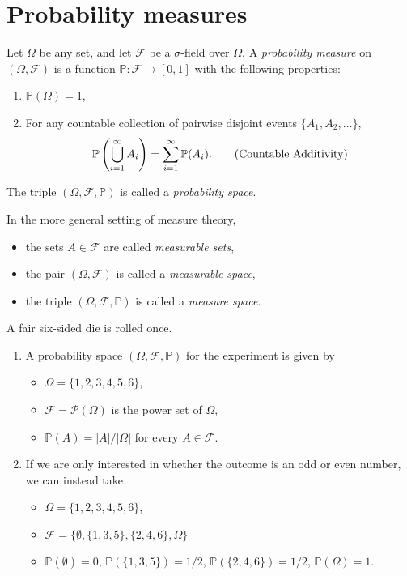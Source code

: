 \documentclass[lecture]{csm}
\newcommand{\prob}{\mathbb{P}}
\def\it{\item}
\def\bit{\begin{itemize}}
\def\eit{\end{itemize}}
\def\ben{\begin{enumerate}}
\def\een{\end{enumerate}}
\begin{document}
\maketitle
\tableofcontents

\section{Probability measures}

\begin{definition}
Let $\Omega$ be any set, and let $\mathcal{F}$ be a $\sigma$-field over $\Omega$. 
A \emph{probability measure} on $(\Omega,\mathcal{F})$ is a function $\prob:\mathcal{F}\to[0,1]$ with the following properties:
\ben
\it $\prob(\Omega) = 1$,
\it For any countable collection of pairwise disjoint events $\{A_1,A_2,\ldots\}$,
\[
\prob\left(\bigcup_{i=1}^\infty A_i\right) = \sum_{i=1}^{\infty} \prob(A_i).
\text{\qquad (Countable Additivity)}
\]
\een
The triple $(\Omega,\mathcal{F},\prob)$ is called a \emph{probability space}.
\end{definition}


\begin{remark}
In the more general setting of measure theory,
\bit
\it the sets $A\in\mathcal{F}$ are called \emph{measurable sets},
\it the pair $(\Omega,\mathcal{F})$ is called a \emph{measurable space},
\it the triple $(\Omega,\mathcal{F},\prob)$ is called a \emph{measure space}.
\eit
\end{remark}

\begin{example}
A fair six-sided die is rolled once. 
\ben
\it A probability space $(\Omega,\mathcal{F}, \prob)$ for the experiment is given by
\bit
\it $\Omega=\{1,2,3,4,5,6\}$,
\it $\mathcal{F} = \mathcal{P}(\Omega)$ is the power set of $\Omega$,
\it $\prob(A)=|A|/|\Omega|$ for every $A\in\mathcal{F}$.
\eit

\it If we are only interested in whether the outcome is an odd or even number, we can instead take
\bit
\it $\Omega=\{1,2,3,4,5,6\}$,
\it $\mathcal{F} = \big\{\emptyset,\{1,3,5\},\{2,4,6\},\Omega\big\}$
\it $\prob(\emptyset)=0$, $\prob(\{1,3,5\})=1/2$, $\prob(\{2,4,6\})=1/2$, $\prob(\Omega)=1$.
\eit
\een
\end{example}
\end{document}
